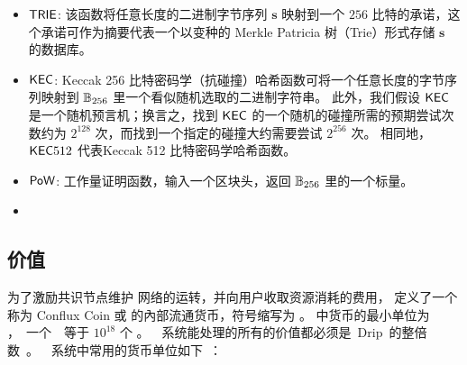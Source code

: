 \begin{itemize}[nosep]
	
	\item $\mathsf{TRIE}$: 该函数将任意长度的二进制字节序列 $\mathbf{s}$ 映射到一个 $256$ 比特的承诺，这个承诺可作为摘要代表一个以变种的 Merkle Patricia 树（Trie）形式存储 $\mathbf{s}$ 的数据库。
	
	
	\item $\mathsf{KEC}$: Keccak 256 比特密码学（抗碰撞）哈希函数可将一个任意长度的字节序列映射到 $\mathbb{B}_{256}$ 里一个看似随机选取的二进制字符串。
	此外，我们假设 $\mathsf{KEC}$ 是一个随机预言机；换言之，找到 $\mathsf{KEC}$ 的一个随机的碰撞所需的预期尝试次数约为 $2^{128}$ 次，而找到一个指定的碰撞大约需要尝试 $2^{256}$ 次。
	相同地，$\mathsf{KEC}512$ 代表Keccak 512 比特密码学哈希函数。
	
	
	\item $\mathsf{PoW}$: 工作量证明函数，输入一个区块头，返回 $\mathbb{B}_{256}$ 里的一个标量。
	
	
	\item {}
\end{itemize}


\subsection{价值}
为了激励共识节点维护 {\name} 网络的运转，并向用户收取资源消耗的费用，
{\name} 定义了一个称为 Conflux Coin 或 \coin 的內部流通货币，符号缩写为 \coinsign。
{\name} 中货币的最小单位为 \unit，一个 \coin 等于 $10^{18}$ 个 \unit。
{\name} 系统能处理的所有的价值都必须是 Drip 的整倍数。
{\name} 系统中常用的货币单位如下：

